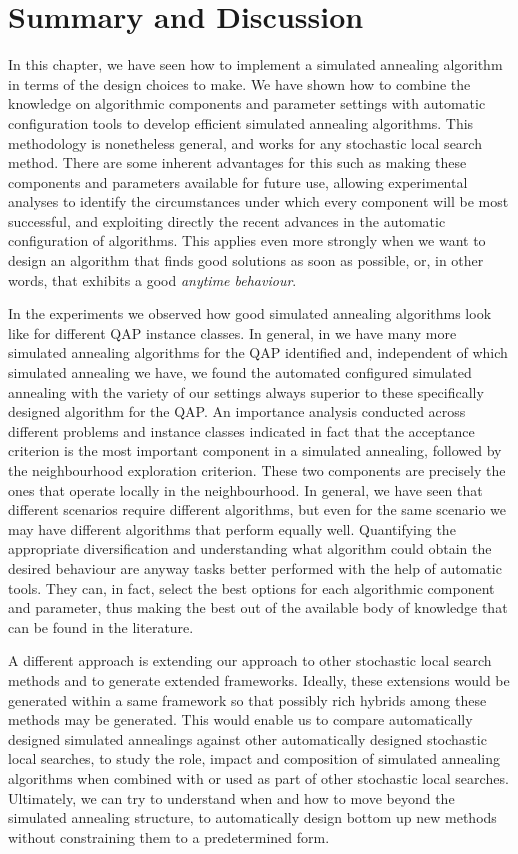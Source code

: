 \section{Summary and Discussion}
\label{sec:conclusions}

In this chapter, we have seen how to implement a simulated annealing 
algorithm in terms of the design choices to make. 
We have shown how to combine the knowledge on algorithmic components 
and parameter settings  with automatic configuration tools 
to develop efficient simulated annealing
algorithms. This methodology is nonetheless general, 
and works for any stochastic local search method.
There are some inherent advantages 
for this such as making these components and parameters available for 
future use, allowing experimental analyses to identify the circumstances under which
every component will be most successful,
and exploiting directly the recent advances in the automatic 
configuration of algorithms.
This applies even more strongly when we want to design an algorithm that finds
good solutions as soon as possible, or, in other words, that exhibits a good 
\textit{anytime behaviour}. 

In the experiments we observed how good simulated annealing algorithms look 
like for different QAP instance classes.  
In general, in \cite{FraStu2019:cor} we have many more simulated annealing algorithms 
for the QAP identified and, independent of which simulated annealing we have, 
we found the automated configured simulated annealing with the variety of our settings 
always superior to these specifically designed algorithm for the QAP.
An importance analysis conducted across different problems and instance classes
indicated in fact that the acceptance criterion is the most important component in a
simulated annealing, followed by the neighbourhood exploration criterion. 
These two components are precisely the ones that operate locally in the neighbourhood.
In general, we have seen that different scenarios require different algorithms,
but even for the same scenario we may have different algorithms that perform 
equally well. 
Quantifying the appropriate diversification and understanding what algorithm 
could obtain the desired behaviour are anyway tasks 
better performed with the help of automatic tools. They can, in fact, 
select the best options for each algorithmic component and parameter, 
thus making the best out of the available body of knowledge that can be
found in the literature. 

A different approach is extending our approach to other stochastic local search methods and to 
generate extended frameworks. Ideally, these extensions would be 
generated within a same framework so that possibly rich hybrids 
among these methods may be generated. This would enable us to 
compare automatically designed simulated annealings against other automatically 
designed stochastic local searches, to study the role, impact and composition of 
simulated annealing algorithms when combined with or used as part of other 
stochastic local searches. Ultimately, we can try to understand 
when and how to move beyond the simulated 
annealing structure, to automatically design bottom up new methods without 
constraining them to a predetermined form.

